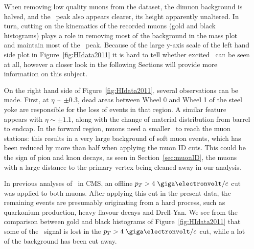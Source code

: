 When removing low quality muons from the dataset, the dimuon background is
halved, and the \PgUa\ peak also appears clearer, its height apparently unaltered. In turn, cutting on the
kinematics of the recorded muons (gold and black histograms) plays a role in removing
most of the background in the mass plot and maintain most of the
\PgUa\ peak. Because of the large y-axis scale of the left hand side plot in
Figure~\ref{fig:HIdata2011} it is hard to tell whether excited \PgUb\
can be seen at all, however a closer look in the following Sections
will provide more information on this subject.


On the right hand side of Figure~\ref{fig:HIdata2011}, several
observations can be made. First, at $\eta \sim \pm 0.3$, dead areas
between Wheel 0 and Wheel 1 of the steel yoke are responsible for the
loss of events in that region. A similar feature appears with $\eta
\sim \pm 1.1$, along with the change of material distribution from
barrel to endcap. In the forward region, muons need a smaller \pt\ to
reach the muon stations: this results in a very large background of
soft muon events, which has been reduced by more
than half when applying the muon ID cuts. This could be the sign of
pion and kaon decays, as seen in
Section~\ref{sec:muonID}, the muons with a large distance to the
primary vertex being cleaned away in our analysis. 


In previous analyses of \PgU\ in CMS, an offline $\pt > 4 \; \GeVc$ cut
was applied to both muons. After applying this cut in the present data, the remaining events
are presumably originating from a hard process, such as
quarkonium production, heavy flavour decays and Drell-Yan. We see from
the comparison between gold and black histograms of
Figure~\ref{fig:HIdata2011} that some of the
\PgU\ signal is lost in the $\pt > 4 \; \GeVc$ cut, while a lot of the background has
been cut away. 

